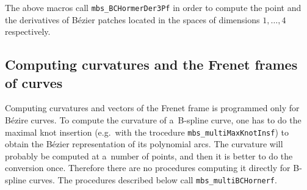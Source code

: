\vspace{\bigskipamount}
The above macros call \texttt{mbs\_BCHormerDer3Pf} in order to compute the point
and the derivatives of B\'{e}zier patches located in the spaces
of dimensions $1,\ldots,4$ respectively.


\newpage
\subsection{Computing curvatures and the Frenet frames of curves}

Computing curvatures and vectors of the Frenet frame is programmed
only for B\'{e}zire curves. To compute the curvature of a~B-spline
curve, one has to do the maximal knot insertion (e.g.\ with the trocedure
\texttt{mbs\_multiMaxKnotInsf}) to obtain the B\'{e}zier representation of
its polynomial arcs. The curvature will probably be computed at a~number
of points, and then it is better to do the conversion once. Therefore there
are no procedures computing it directly for B-spline curves. The procedures
described below call \texttt{mbs\_multiBCHornerf}.

